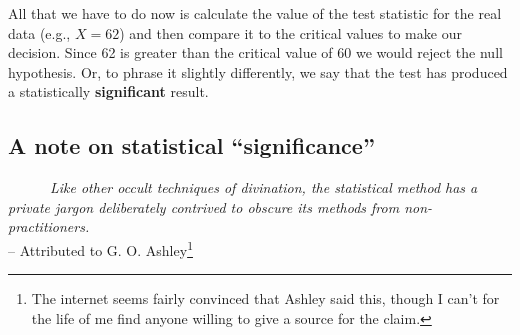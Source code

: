 \documentclass[
]{book}
\begin{document}
All that we have to do now is calculate the value of the test statistic for the real data (e.g., \(X = 62\)) and then compare it to the critical values to make our decision. Since 62 is greater than the critical value of 60 we would reject the null hypothesis. Or, to phrase it slightly differently, we say that the test has produced a statistically {\textbf{significant}} result.

\hypertarget{a-note-on-statistical-significance}{%
\subsection{A note on statistical ``significance''}\label{a-note-on-statistical-significance}}

~~~~~~\emph{Like other occult techniques of divination, the statistical method has a private jargon deliberately contrived to obscure its methods from non-practitioners.}\\
\hspace*{0.333em}\hspace*{0.333em}\hspace*{0.333em}\hspace*{0.333em}\hspace*{0.333em}\hspace*{0.333em}\hspace*{0.333em}\hspace*{0.333em}\hspace*{0.333em}\hspace*{0.333em}\hspace*{0.333em}\hspace*{0.333em}\hspace*{0.333em}\hspace*{0.333em}\hspace*{0.333em}\hspace*{0.333em}\hspace*{0.333em}\hspace*{0.333em}\hspace*{0.333em}\hspace*{0.333em}\hspace*{0.333em}\hspace*{0.333em}\hspace*{0.333em}\hspace*{0.333em}\hspace*{0.333em}\hspace*{0.333em}\hspace*{0.333em}\hspace*{0.333em}\hspace*{0.333em}\hspace*{0.333em}-- Attributed to G. O. Ashley\footnote{The internet seems fairly convinced that Ashley said this, though I can't for the life of me find anyone willing to give a source for the claim.}
\end{document}
